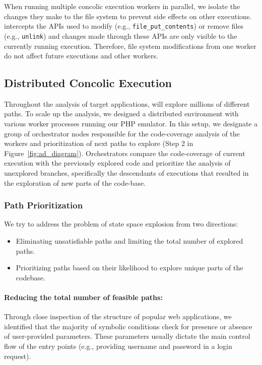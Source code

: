 When running multiple concolic execution workers in parallel, we isolate the changes they make to the file system to prevent side effects on other executions. 
\animatedead{} intercepts the APIs used to modify (e.g., \texttt{file\_put\_contents}) or remove files (e.g., \texttt{unlink}) and changes made through these APIs are only visible to the currently running execution. 
Therefore, file system modifications from one worker do not affect future executions and other workers. 

\subsection{Distributed Concolic Execution} 

Throughout the analysis of target applications, \animatedead{} will explore millions of different paths. 
To scale up the analysis, we designed a distributed environment with various worker processes running our PHP emulator. 
In this setup, we designate a group of orchestrator nodes responsible for the code-coverage analysis of the workers and prioritization of next paths to explore (Step 2 in Figure~\ref{fig:ad_diagram}). 
Orchestrators compare the code-coverage of current execution with the previously explored code and prioritize the analysis of unexplored branches, specifically the descendants of executions that resulted in the exploration of new parts of the code-base. 

\subsubsection{Path Prioritization}

We try to address the problem of state space explosion from two directions:
\begin{itemize}
    \item Eliminating unsatisfiable paths and limiting the total number of explored paths.
    \item Prioritizing paths based on their likelihood to explore unique parts of the codebase.
\end{itemize}

\paragraph{Reducing the total number of feasible paths:} 
Through close inspection of the structure of popular web applications, we identified that the majority of symbolic conditions check for presence or absence of user-provided parameters. 
These parameters usually dictate the main control flow of the entry points (e.g., providing username and password in a login request). 

